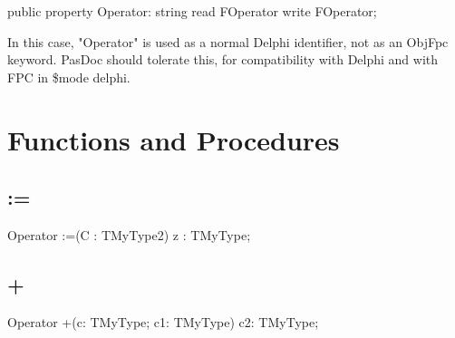 \documentclass{report}
\begin{document}
\begin{list}{}{
\setlength{\itemindent}{0cm}
\setlength{\listparindent}{0cm}
\setlength{\leftmargin}{\evensidemargin}
\addtolength{\leftmargin}{\tmplength}
\settowidth{\labelsep}{X}
\addtolength{\leftmargin}{\labelsep}
\setlength{\labelwidth}{\tmplength}
}
\begin{flushleft}
\item[\textbf{Declaration}\hfill]
\begin{ttfamily}
public property Operator: string read FOperator write FOperator;\end{ttfamily}


\end{flushleft}
\par
\item[\textbf{Description}]
In this case, "Operator" is used as a normal Delphi identifier, not as an ObjFpc keyword. PasDoc should tolerate this, for compatibility with Delphi and with FPC in {\$}mode delphi.

\end{list}
\section{Functions and Procedures}
\subsection*{:=}
\begin{list}{}{
\setlength{\itemindent}{0cm}
\setlength{\listparindent}{0cm}
\setlength{\leftmargin}{\evensidemargin}
\addtolength{\leftmargin}{\tmplength}
\settowidth{\labelsep}{X}
\addtolength{\leftmargin}{\labelsep}
\setlength{\labelwidth}{\tmplength}
}
\begin{flushleft}
\item[\textbf{Declaration}\hfill]
\begin{ttfamily}
Operator :=(C : TMyType2) z : TMyType;\end{ttfamily}


\end{flushleft}
\end{list}
\subsection*{+}
\begin{list}{}{
\setlength{\itemindent}{0cm}
\setlength{\listparindent}{0cm}
\setlength{\leftmargin}{\evensidemargin}
\addtolength{\leftmargin}{\tmplength}
\settowidth{\labelsep}{X}
\addtolength{\leftmargin}{\labelsep}
\setlength{\labelwidth}{\tmplength}
}
\begin{flushleft}
\item[\textbf{Declaration}\hfill]
\begin{ttfamily}
Operator +(c: TMyType; c1: TMyType) c2: TMyType;\end{ttfamily}


\end{flushleft}
\end{list}
\end{document}
